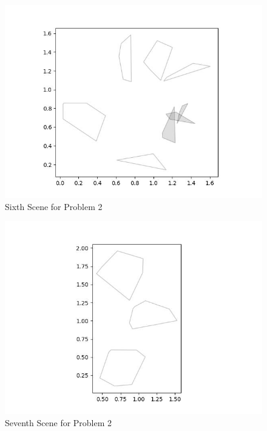 \documentclass{article}
\begin{document}
\begin{figure}[h!]
	\includegraphics[width= 0.9 \linewidth]{Problem2_scene6.jpg}
	\centering
	\caption{Sixth Scene for Problem 2}
	\label{Problem2_scene6.jpg}
\end{figure}

\begin{figure}[h!]
	\includegraphics[width= 0.9 \linewidth]{Problem2_scene7.jpg}
	\centering
	\caption{Seventh Scene for Problem 2}
	\label{Problem2_scene7.jpg}
\end{figure}
\end{document}
